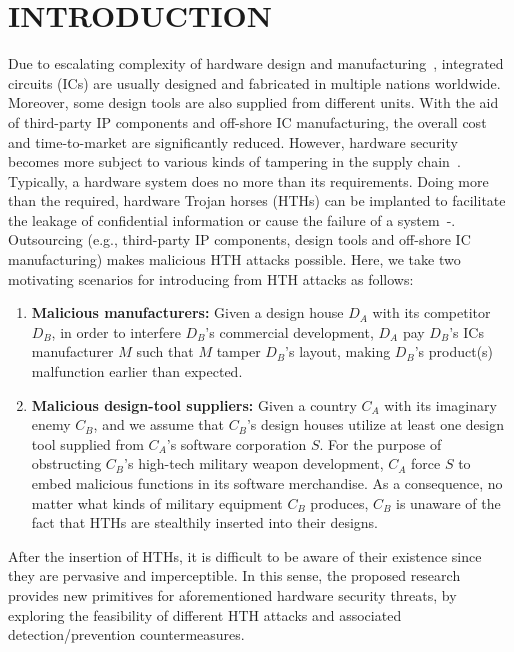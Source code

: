 \section{INTRODUCTION}
Due to escalating complexity of hardware design and manufacturing~\cite{wilson2013international}, integrated circuits (ICs) are usually designed and fabricated in multiple nations worldwide. Moreover, some design tools are also supplied from different units. With the aid of third-party IP components and off-shore IC manufacturing, the overall cost and time-to-market are significantly reduced. However, hardware security becomes more subject to various kinds of tampering in the supply chain~\cite{tehranipoor2011trustworthy}\cite{karri2010trustworthy}. Typically, a hardware system does no more than its requirements. Doing more than the required, hardware Trojan horses (HTHs) can be implanted to facilitate the leakage of confidential information or cause the failure of a system~\cite{adee2008hunt}-\cite{bhunia2014hardware}. Outsourcing (e.g., third-party IP components, design tools and off-shore IC manufacturing) makes malicious HTH attacks possible. Here, we take two motivating scenarios for introducing from HTH attacks as follows:
\begin{enumerate}[wide, labelwidth=!, labelindent=0pt]%
	\item \textbf{Malicious manufacturers:} Given a design house $D_{A}$ with its competitor $D_{B}$, in order to interfere $D_{B}$'s commercial development, $D_{A}$ pay $D_{B}$'s ICs manufacturer $M$ such that $M$ tamper $D_{B}$'s layout, making $D_{B}$'s product(s) malfunction earlier than expected.
	\item \textbf{Malicious design-tool suppliers:} Given a country $C_{A}$ with its imaginary enemy $C_{B}$, and we assume that $C_{B}$'s design houses utilize at least one design tool supplied from $C_{A}$'s software corporation $S$. For the purpose of obstructing $C_{B}$'s high-tech military weapon development, $C_{A}$ force $S$ to embed malicious functions in its software merchandise. As a consequence, no matter what kinds of military equipment $C_{B}$ produces, $C_{B}$ is unaware of the fact that HTHs are stealthily inserted into their designs.
\end{enumerate}

After the insertion of HTHs, it is difficult to be aware of their existence since they are pervasive and imperceptible. In this sense, the proposed research provides new primitives for aforementioned hardware security threats, by exploring the feasibility of different HTH attacks and associated detection/prevention countermeasures.

